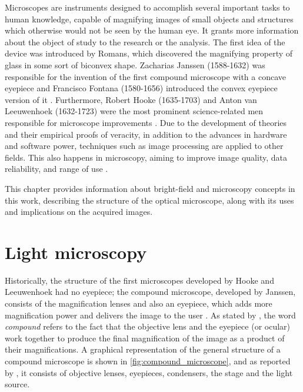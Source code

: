 Microscopes are instruments designed to accomplish several important tasks to human knowledge, capable of magnifying images of small objects and structures which otherwise would not be seen by the human eye. It grants more information about the object of study to the research or the analysis. The first idea of the device was introduced by Romans, which discovered the magnifying property of glass in some sort of biconvex shape. Zacharias Janssen (1588-1632) was responsible for the invention of the first compound microscope with a concave eyepiece and  Francisco Fontana (1580-1656) introduced the convex eyepiece version of it \cite{zilio2009optica}. Furthermore, Robert Hooke (1635-1703) and Anton van Leeuwenhoek (1632-1723) were the most prominent science-related men responsible for microscope improvements \cite{wu2008microscope}. Due to the development of theories and their empirical proofs of veracity, in addition to the advances in hardware and software power, techniques such as image processing are applied to other fields. This also happens in microscopy, aiming to improve image quality, data reliability, and range of use \cite{boyde1990modern}.

This chapter provides information about bright-field and microscopy concepts in this work, describing the structure of the optical microscope, along with its uses and implications on the acquired images.


% 
    
\section{Light microscopy}
\label{sec:light_microscopy}

Historically, the structure of the first microscopes developed by Hooke and Leeuwenhoek had no eyepiece; the compound microscope, developed by Janssen, consists of the magnification lenses and also an eyepiece, which adds more magnification power and delivers the image to the user \cite{lawlor2019introduction}. As stated by , the word \emph{compound} refers to the fact that the objective lens and the eyepiece (or ocular) work together to produce the final magnification of the image as a product of their magnifications. A graphical representation of the general structure of a compound microscope is shown in \autoref{fig:compound_microscope}, and as reported by , it consists of objective lenses, eyepieces, condensers, the stage and the light source.

